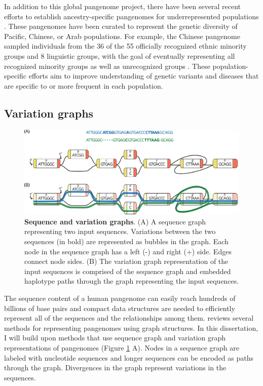\documentclass[11pt]{ucscthesis}
\begin{document}
In addition to this global pangenome project, there have been several recent efforts to establish ancestry-specific pangenomes for underrepresented populations \cite{pacific_pangenome_2024,chinese_pangenome_2023,arab_pangenome_2024}.
These pangenomes have been curated to represent the genetic diversity of Pacific, Chinese, or Arab populations.
For example, the Chinese pangenome sampled individuals from the 36 of the 55 officially recognized ethnic minority groups and 8 linguistic groups, with the goal of eventually representing all recognized minority groups as well as unrecognized groups \cite{chinese_pangenome_2023}.
These population-specific efforts aim to improve understanding of genetic variants and diseases that are specific to or more frequent in each population.


\subsection{Variation graphs}
\begin{figure}
    \centering
    \includegraphics[width=\columnwidth]{example_graph.pdf}
    \caption[Sequence and variation graphs]{\textbf{Sequence and variation graphs}. (A) A sequence graph representing two input sequences. Variations between the two sequences (in bold) are represented as bubbles in the graph. Each node in the sequence graph has a left (-) and right (+) side. Edges connect node sides. (B) The variation graph representation of the input sequences is comprised of the sequence graph and embedded haplotype paths through the graph representing the input sequences.}
    \label{fig:example_graph}
\end{figure}

The sequence content of a human pangenome can easily reach hundreds of billions of base pairs and compact data structures are needed to efficiently represent all of the sequences and the relationships among them. 
\citet{eizenga_pangenome_2020} reviews several methods for representing pangenomes using graph structures.
In this dissertation, I will build upon methods that use sequence graph and variation graph representations of pangenomes \cite{garrison_vg_2018} (Figure \ref{fig:example_graph} A).
Nodes in a sequence graph are labeled with nucleotide sequences and longer sequences can be encoded as paths through the graph.
Divergences in the graph represent variations in the sequences.
\end{document}
